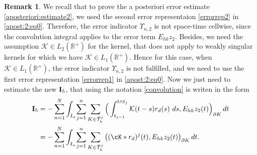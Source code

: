 \documentclass{amsart}
\numberwithin{equation}{section}
\theoremstyle{definition}
\newtheorem{remark}{Remark}
\begin{document}
\begin{remark}
We recall that to prove the a posteriori error estimate 
\eqref{aposteriori:estimate2}, we used the second  
error representaion \eqref{errorrep2} in \eqref{apost:2:eq0}. 
Therefore, the error indicator $\Upsilon_{n,2}$ is not space-time 
cellwise, since the convolution integral applies to the 
error term $E_{hk}z_2$.  Besides, we need the assumption 
${\mathcal K} \in L_2(\mathbb{R}^+)$ for the kernel, 
that does not apply to weakly singular 
kernels for which we have ${\mathcal K} \in L_1(\mathbb{R}^+)$. 
Hence for this case, when ${\mathcal K} \in L_1(\mathbb{R}^+)$, the error indicator 
$\Upsilon_{n,2}$ is not fulfilled, and we need to use the first 
error representation \eqref{errorrep1} in \eqref{apost:2:eq0}. 
Now we just need to estimate the new ${\rm{\bf I}}_5$, 
that using  the notation \eqref{convolution} is writen in the form 
\begin{equation*}   
  \begin{split}
    {\rm{\bf I}}_5
    &=-\sum_{n=1}^N\int_{I_n}\!
    \sum_{j=1}^n \sum_{K\in\bar{\mathcal T}_h^j}
    \Big(\int_{t_{j-1}}^{t\wedge t_j} {\mathcal K}(t-s)r_d(s)\ ds,
      E_{hk}z_2(t)\Big)_{\partial K}\,dt\\
    &=-\sum_{n=1}^N\int_{I_n}\!
    \sum_{j=1}^n\sum_{K\in\bar{\mathcal T}_h^j}
    \big((\cK*r_d)^j(t),E_{hk}z_2(t)\big)_{\partial K}\,dt.
  \end{split}
\end{equation*}


\end{remark}
\end{document}
